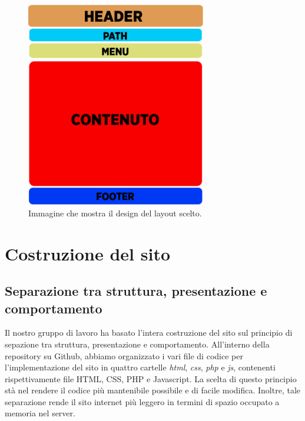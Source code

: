 \documentclass[12pt, a4paper]{article}
\begin{document}
\begin{figure}[htb]
	\centering
	\includegraphics[height=9cm]{img/schema_pagina.png}
	\caption{Immagine che mostra il design del layout scelto.}	
\end{figure}

\section{Costruzione del sito}

\subsection{Separazione tra struttura, presentazione e comportamento}
Il nostro gruppo di lavoro ha basato l'intera costruzione del sito sul principio di sepazione tra struttura, presentazione e comportamento. All'interno della repository su Github, abbiamo organizzato i vari file di codice per l'implementazione del sito in quattro
cartelle \textit{html}, \textit{css}, \textit{php} e \textit{js}, contenenti rispettivamente file HTML, CSS, PHP e Javascript. La scelta di questo principio stà nel rendere il codice più mantenibile possibile e di facile modifica. Inoltre, tale separazione rende il sito
internet più leggero in termini di spazio occupato a memoria nel server.
\end{document}
